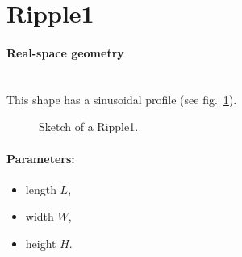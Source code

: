 \newpage
\section{Ripple1}   

\paragraph{Real-space geometry}\mbox{}\\
This shape has a sinusoidal profile (see fig.~\ref{fig:ripple1}).

\begin{figure}[ht]
\hfill
{}
\hfill
{}
\hfill
\caption{Sketch of a Ripple1.}
\label{fig:ripple1}
\end{figure}

\paragraph{Parameters:}
\begin{itemize}
\item length $L$, 
\item width $W$, 
\item height $H$. 
\end{itemize}

